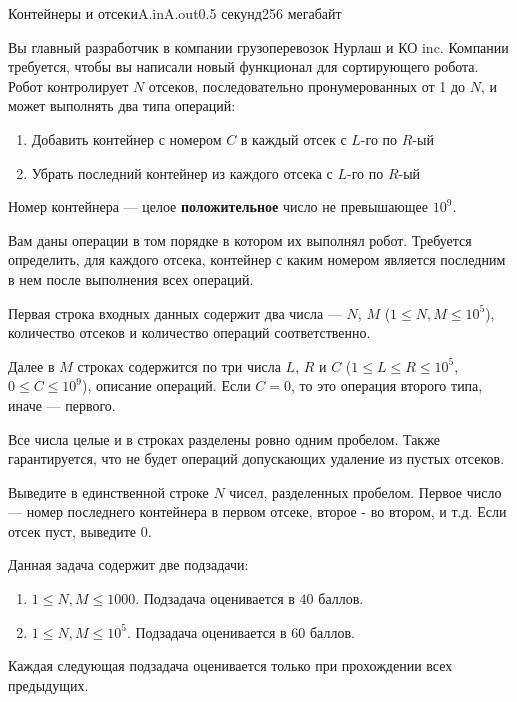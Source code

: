 \begin{problem}{Контейнеры и отсеки}{A.in}{A.out}{0.5 секунд}{256 мегабайт}

Вы главный разработчик в компании грузоперевозок Нурлаш и КО inc. Компании требуется, чтобы вы написали новый функционал для сортирующего робота. Робот контролирует $N$ отсеков, последовательно пронумерованных от 1 до $N$, и может выполнять два типа операций: 

\begin{enumerate}
    \item Добавить контейнер с номером $C$ в каждый отсек с $L$-го по $R$-ый
    \item Убрать последний контейнер из каждого отсека с $L$-го по $R$-ый
\end{enumerate}

Номер контейнера --- целое \textbf{положительное} число не превышающее $10^9$.

Вам даны операции в том порядке в котором их выполнял робот. Требуется определить, для каждого отсека, контейнер с каким номером является последним в нем после выполнения всех операций.

\InputFile
Первая строка входных данных содержит два числа --- $N$, $M$ ($1 \leq N, M \leq 10^5$), количество отсеков и количество операций соответственно.

Далее в $M$ строках содержится по три числа $L$, $R$ и $C$ ($1 \leq L \leq R \leq 10^5$, $0 \leq C \leq 10^9$), описание операций.
Если $C = 0$, то это операция второго типа, иначе --- первого.

Все числа целые и в строках разделены ровно одним пробелом. Также гарантируется, что не будет операций допускающих удаление из пустых отсеков.

\OutputFile
Выведите в единственной строке $N$ чисел, разделенных пробелом.
Первое число --- номер последнего контейнера в первом отсеке, второе - во втором, и т.д.
Если отсек пуст, выведите $0$.

\Examples

\begin{example}
%
\end{example}


\Scoring
Данная задача содержит две подзадачи:
\begin{enumerate}
\item $1 \leq N, M \leq 1000$. Подзадача оценивается в $40$ баллов.
\item $1 \leq N, M \leq 10^5$. Подзадача оценивается в $60$ баллов.
\end{enumerate}

Каждая следующая подзадача оценивается только при прохождении всех предыдущих.

\end{problem}
